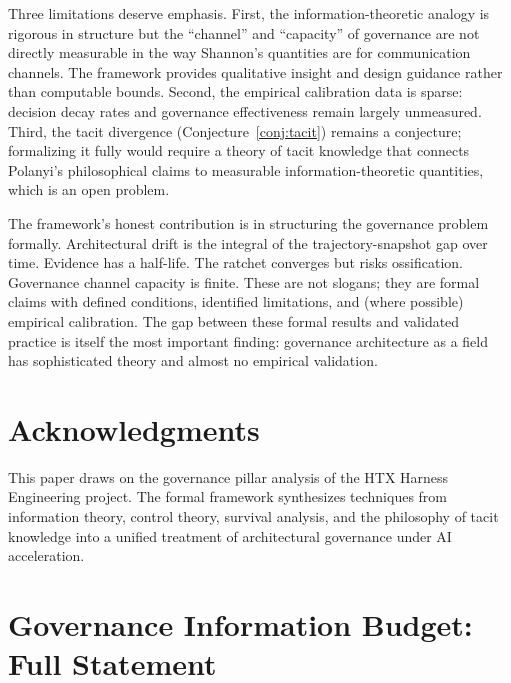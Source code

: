 \documentclass[11pt, a4paper, copyright]{googledeepmind}
\begin{document}
Three limitations deserve emphasis. First, the information-theoretic analogy is rigorous in structure but the ``channel'' and ``capacity'' of governance are not directly measurable in the way Shannon's quantities are for communication channels. The framework provides qualitative insight and design guidance rather than computable bounds. Second, the empirical calibration data is sparse: decision decay rates and governance effectiveness remain largely unmeasured. Third, the tacit divergence (Conjecture~\ref{conj:tacit}) remains a conjecture; formalizing it fully would require a theory of tacit knowledge that connects Polanyi's philosophical claims to measurable information-theoretic quantities, which is an open problem.

The framework's honest contribution is in structuring the governance problem formally. Architectural drift is the integral of the trajectory-snapshot gap over time. Evidence has a half-life. The ratchet converges but risks ossification. Governance channel capacity is finite. These are not slogans; they are formal claims with defined conditions, identified limitations, and (where possible) empirical calibration. The gap between these formal results and validated practice is itself the most important finding: governance architecture as a field has sophisticated theory and almost no empirical validation.

\section*{Acknowledgments}

This paper draws on the governance pillar analysis of the HTX Harness Engineering project. The formal framework synthesizes techniques from information theory, control theory, survival analysis, and the philosophy of tacit knowledge into a unified treatment of architectural governance under AI acceleration.





\appendix

\section{Governance Information Budget: Full Statement}
\label{app:budget}
\end{document}
